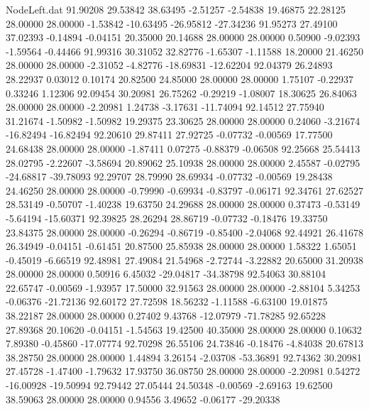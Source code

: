\begin{filecontents}{NodeLeft.dat}
  91.90208   29.53842   38.63495    -2.51257   -2.54838   19.46875   22.28125   28.00000   28.00000   -1.53842  -10.63495  -26.95812  -27.34236
  91.95273   27.49100   37.02393    -0.14894   -0.04151   20.35000   20.14688   28.00000   28.00000    0.50900   -9.02393   -1.59564   -0.44466
  91.99316   30.31052   32.82776    -1.65307   -1.11588   18.20000   21.46250   28.00000   28.00000   -2.31052   -4.82776  -18.69831  -12.62204
  92.04379   26.24893   28.22937     0.03012    0.10174   20.82500   24.85000   28.00000   28.00000    1.75107   -0.22937    0.33246    1.12306
  92.09454   30.20981   26.75262    -0.29219   -1.08007   18.30625   26.84063   28.00000   28.00000   -2.20981    1.24738   -3.17631  -11.74094
  92.14512   27.75940   31.21674    -1.50982   -1.50982   19.29375   23.30625   28.00000   28.00000    0.24060   -3.21674  -16.82494  -16.82494
  92.20610   29.87411   27.92725    -0.07732   -0.00569   17.77500   24.68438   28.00000   28.00000   -1.87411    0.07275   -0.88379   -0.06508
  92.25668   25.54413   28.02795    -2.22607   -3.58694   20.89062   25.10938   28.00000   28.00000    2.45587   -0.02795  -24.68817  -39.78093
  92.29707   28.79990   28.69934    -0.07732   -0.00569   19.28438   24.46250   28.00000   28.00000   -0.79990   -0.69934   -0.83797   -0.06171
  92.34761   27.62527   28.53149    -0.50707   -1.40238   19.63750   24.29688   28.00000   28.00000    0.37473   -0.53149   -5.64194  -15.60371
  92.39825   28.26294   28.86719    -0.07732   -0.18476   19.33750   23.84375   28.00000   28.00000   -0.26294   -0.86719   -0.85400   -2.04068
  92.44921   26.41678   26.34949    -0.04151   -0.61451   20.87500   25.85938   28.00000   28.00000    1.58322    1.65051   -0.45019   -6.66519
  92.48981   27.49084   21.54968    -2.72744   -3.22882   20.65000   31.20938   28.00000   28.00000    0.50916    6.45032  -29.04817  -34.38798
  92.54063   30.88104   22.65747    -0.00569   -1.93957   17.50000   32.91563   28.00000   28.00000   -2.88104    5.34253   -0.06376  -21.72136
  92.60172   27.72598   18.56232    -1.11588   -6.63100   19.01875   38.22187   28.00000   28.00000    0.27402    9.43768  -12.07979  -71.78285
  92.65228   27.89368   20.10620    -0.04151   -1.54563   19.42500   40.35000   28.00000   28.00000    0.10632    7.89380   -0.45860  -17.07774
  92.70298   26.55106   24.73846    -0.18476   -4.84038   20.67813   38.28750   28.00000   28.00000    1.44894    3.26154   -2.03708  -53.36891
  92.74362   30.20981   27.45728    -1.47400   -1.79632   17.93750   36.08750   28.00000   28.00000   -2.20981    0.54272  -16.00928  -19.50994
  92.79442   27.05444   24.50348    -0.00569   -2.69163   19.62500   38.59063   28.00000   28.00000    0.94556    3.49652   -0.06177  -29.20338

\end{filecontents}
